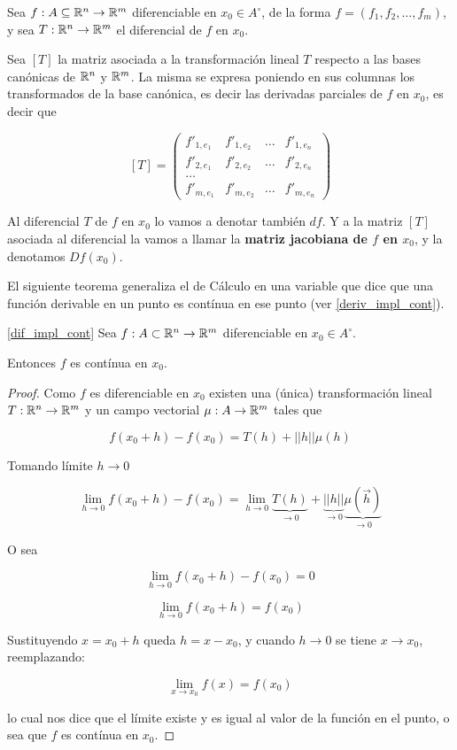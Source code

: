 \begin{definition}[Jacobiana]
Sea $f : A \subseteq \mathbb{R}^n \to \mathbb{R}^m$  diferenciable en $x_0 \in A^{\circ}$, de la forma $ f = (f_1, f_2, \ldots, f_m)$, y sea $T : \mathbb{R}^n \to \mathbb{R}^m$ el diferencial de $f$ en $x_0$.

Sea $[T]$ la matriz asociada a la transformación lineal $T$ respecto a las bases canónicas de $\mathbb{R}^n$ y $\mathbb{R}^m$.  La misma se expresa poniendo en sus columnas los transformados de la base canónica, es decir las derivadas parciales de $f$ en $x_0$, es decir que

$$ [T] = \begin{pmatrix} f'_{1, e_1} & f'_{1, e_2} & \ldots & f'_{1, e_n} \\ f'_{2, e_1} & f'_{2, e_2} & \ldots & f'_{2, e_n} \\ \ldots \\ f'_{m, e_1} & f'_{m, e_2} & \ldots & f'_{m, e_n} \end{pmatrix} $$

Al diferencial $T$ de $f$ en $x_0$ lo vamos a denotar también $df$.  Y a la matriz $[T]$ asociada al diferencial la vamos a llamar la \textbf{matriz jacobiana de $f$ en $x_0$},  y la denotamos $Df(x_0)$.
\end{definition}

El siguiente teorema generaliza el de Cálculo en una variable que dice que una función derivable en un punto es contínua en ese punto (ver \ref{deriv_impl_cont}).

\begin{theorem} \ref{dif_impl_cont}
Sea $ f : A \subset \mathbb{R}^n \to \mathbb{R}^m$ diferenciable en $x_0 \in A^{\circ}$.

Entonces $f$ es contínua en $x_0$.
\end{theorem}

\begin{proof}
Como $ f$ es diferenciable en $x_0$ existen una (única) transformación lineal $ T : \mathbb{R}^n \to \mathbb{R}^m$ y un campo vectorial $ \mu : A \to \mathbb{R}^m$ tales que

$$ f(x_0 + h) - f(x_0) = T(h) + ||h|| \mu(h) $$

Tomando límite $h \to 0$

$$ \lim_{h \to 0} f(x_0 + h) - f(x_0) = \lim_{h \to 0} \underbrace{T(h)}_{\to 0} + \underbrace{||h||}_{\to 0} \underbrace{\mu(\vec{h})}_{\to 0}$$

O sea

$$ \lim_{h \to 0} f(x_0 + h) - f(x_0) = 0 $$

$$ \lim_{h \to 0} f(x_0 + h) = f(x_0) $$

Sustituyendo $ x = x_0 + h$ queda $ h = x - x_0$, y cuando $ h \to 0$ se tiene $x \to x_0$, reemplazando:

$$ \lim_{x \to x_0} f(x) = f(x_0) $$

lo cual nos dice que el límite existe y es igual al valor de la función en el punto, o sea que $f$ es contínua en $x_0$.
\end{proof}

